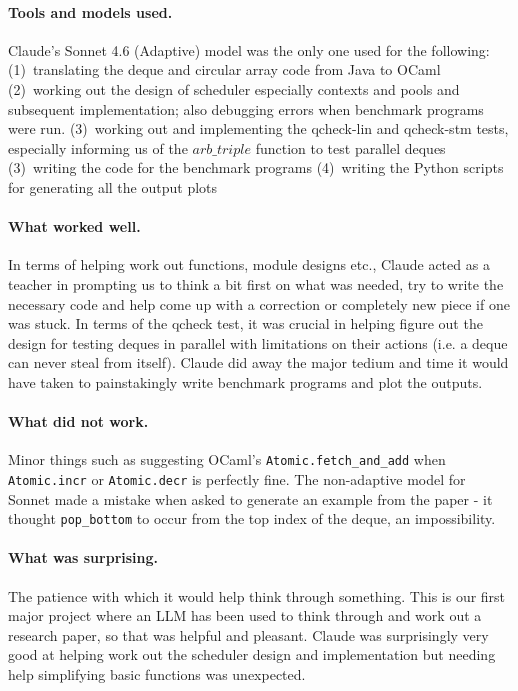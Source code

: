 \documentclass[11pt,a4paper]{article}
\begin{document}
\paragraph{Tools and models used.}
Claude's Sonnet 4.6 (Adaptive) model was the only one used for the following:
     (1)~translating the deque and circular array code from Java to OCaml
     (2)~working out the design of scheduler especially contexts and pools and
     subsequent implementation; also debugging errors when benchmark programs were run.
     (3)~working out and implementing the qcheck-lin and qcheck-stm tests,
     especially informing us of the $arb\_triple$ function to test parallel deques
     (3)~writing the code for the benchmark programs
     (4)~writing the Python scripts for generating all the output plots

\paragraph{What worked well.}
In terms of helping work out functions, module designs etc., Claude acted
as a teacher in prompting us to think a bit first on what was needed, try to
write the necessary code and help come up with a correction or completely new
piece if one was stuck. In terms of the qcheck test, it was crucial in helping
figure out the design for testing deques in parallel with limitations on their
actions (i.e. a deque can never steal from itself). Claude did away the major
tedium and time it would have taken to painstakingly write benchmark programs
and plot the outputs.


\paragraph{What did not work.}
Minor things such as suggesting OCaml's \texttt{Atomic.fetch\_and\_add} when
\texttt{Atomic.incr} or \texttt{Atomic.decr} is perfectly fine.
The non-adaptive model for Sonnet made a mistake when asked to generate an example
from the paper - it thought \texttt{pop\_bottom} to occur from the top index
of the deque, an impossibility.

\paragraph{What was surprising.}
The patience with which it would help think through something. This is our first
major project where an LLM has been used to think through and work out a
research paper, so that was helpful and pleasant. Claude was
surprisingly very good at helping work out the scheduler design and
implementation but needing help simplifying basic functions was unexpected.
\end{document}
